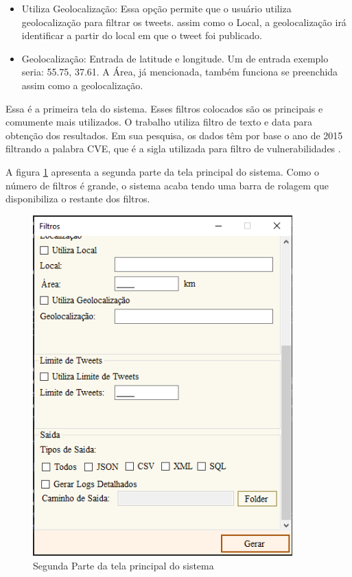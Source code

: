 \begin{itemize}
\begin{itemize}
\item Utiliza Geolocalização: Essa opção permite que o usuário utiliza geolocalização para filtrar os tweets. assim como o Local, a geolocalização irá identificar a partir do local em que o tweet foi publicado.
\item Geolocalização: Entrada de latitude e longitude. Um de entrada exemplo seria: 55.75, 37.61. A Área, já mencionada, também funciona se preenchida assim como a geolocalização.
\end{itemize}

\end{itemize}

Essa é a primeira tela do sistema. Esses filtros colocados são os principais e comumente mais utilizados. O trabalho  utiliza filtro de texto e data para obtenção dos resultados. Em sua pesquisa, os dados têm por base o ano de 2015 filtrando a palabra CVE, que é a sigla utilizada para filtro de vulnerabilidades \cite{CVE1985}.

A figura \ref{fig:TwitterSearch2} apresenta a segunda parte da tela principal do sistema. Como o número de filtros é grande, o sistema acaba tendo uma barra de rolagem que disponibiliza o restante dos filtros.

\begin{figure}[H]
\centering
\includegraphics[width=10cm]{imagens/TwitterSearch2.png}
\caption{Segunda Parte da tela principal do sistema}
\label{fig:TwitterSearch2}
\end{figure}

